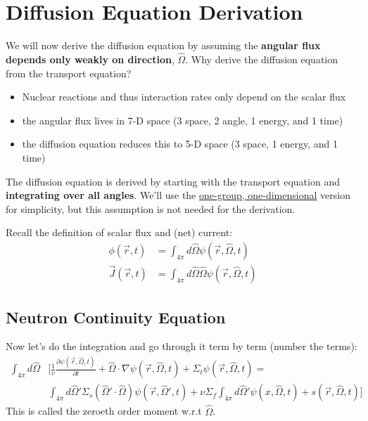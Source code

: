 \documentclass[12pt]{article}
\newlength{\up}
\newcommand{\vOmega}{\ensuremath{\hat{\Omega}}}
\begin{document}
\section{Diffusion Equation Derivation}

We will now derive the diffusion equation by assuming the \textbf{angular flux depends only weakly on direction}, $\vOmega$. 
%
Why derive the diffusion equation from the transport equation?
\begin{itemize}
\item Nuclear reactions and thus interaction rates only depend on the scalar flux
\item the angular flux lives in 7-D space (3 space, 2 angle, 1 energy, and 1 time)
\item the diffusion equation reduces this to 5-D space (3 space, 1 energy, and 1 time)
\end{itemize}

The diffusion equation is derived by starting with the transport equation and \textbf{integrating over all angles}. We'll use the \underline{one-group, one-dimensional} version for simplicity, but this assumption is not needed for the derivation. 

Recall the definition of scalar flux and (net) current:
\begin{align}
\phi(\vec{r}, t) &= \int_{4\pi} d\vOmega \psi(\vec{r}, \vOmega, t) \\
\vec{J}(\vec{r}, t) &= \int_{4\pi} d\vOmega \vOmega \psi(\vec{r}, \vOmega, t)
\end{align}

\subsection{Neutron Continuity Equation}
Now let's do the integration and go through it term by term (number the terms):
%
\begin{align}
\int_{4\pi} d\vOmega &\biggl[\frac{1}{v}\frac{\partial \psi(\vec{r}, \vOmega, t)}{\partial t} + 
\vOmega \cdot \nabla \psi(\vec{r}, \vOmega, t) +
\Sigma_t \psi(\vec{r}, \vOmega, t) = \nonumber\\
%
&\int_{4\pi} d\vOmega' \Sigma_s(\vOmega' \cdot \vOmega) \psi(\vec{r}, \vOmega', t)  
+ \nu \Sigma_f \int_{4\pi} d\vOmega' \psi(x,  \vOmega, t)
+ s(\vec{r}, \vOmega, t)\biggr]
\end{align}
%
This is called the zeroeth order moment w.r.t $\vOmega$. 
\end{document}
